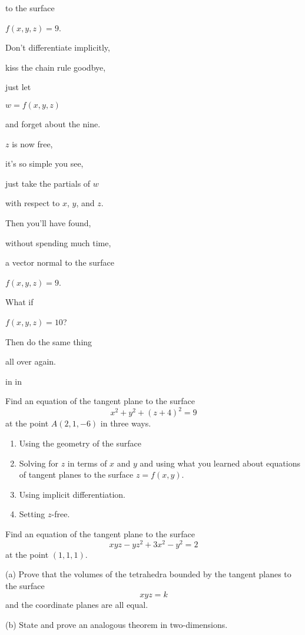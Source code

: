 \documentclass{ximera}
\newcommand{\pskip}{\vskip 0.1 in}
\begin{document}
to the surface

$f(x,y,z)=9$.

Don't differentiate implicitly,

kiss the chain rule goodbye,

just let 

$w=f(x,y,z)$

and forget about the nine.

$z$ is now free,

it's so simple you see,

just take the partials of $w$

with respect to $x$, $y$, and $z$.

Then you'll have found,

without spending much time,

a vector normal to the surface

$f(x,y,z) = 9$.

What if 

$f(x,y,z) = 10$?

Then do the same thing

all over again.


\pskip\pskip


\begin{question} \label{Q356t65yhtrt}
Find an equation of the tangent plane to the surface
\[
       x^2 + y^2 + (z+4)^2 = 9
\]
at the point $A(2,1,-6)$ in three ways.

\begin{enumerate}
\item Using the geometry of the surface

\item Solving for $z$ in terms of $x$ and $y$ and using what you learned about equations of tangent planes to the surface $z=f(x,y)$.

\item Using implicit differentiation.

\item Setting $z$-free. 
\end{enumerate}
\end{question}

\begin{question} \label{Qdfbtt44}
Find an equation of the tangent plane to the surface
\[
    xyz - yz^2 +3x^2 -y^2 = 2
\]
at the point $(1,1,1)$.
\end{question}

\begin{question}  \label{Q435r4gt}
(a) Prove that the volumes of the tetrahedra bounded by the tangent planes to the surface
\[
    xyz = k
\]
and the coordinate planes are all equal.

(b) State and prove an analogous theorem in two-dimensions.
\end{question}
\end{document}
